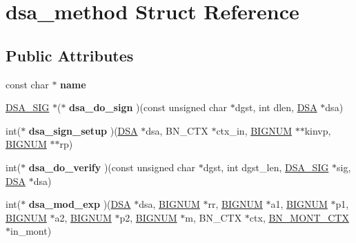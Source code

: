 \hypertarget{structdsa__method}{}\section{dsa\+\_\+method Struct Reference}
\label{structdsa__method}
\subsection*{Public Attributes}
\begin{DoxyCompactItemize}
\item 
\mbox{\label{structdsa__method_a83d504a9d8609d6172a7e4a824791933}} 
const char $\ast$ {\bfseries name}
\item 
\mbox{\label{structdsa__method_acac9dacfe7fd6637af11f0280ed087ad}} 
\hyperlink{struct_d_s_a___s_i_g__st}{D\+S\+A\+\_\+\+S\+IG} $\ast$($\ast$ {\bfseries dsa\+\_\+do\+\_\+sign} )(const unsigned char $\ast$dgst, int dlen, \hyperlink{structdsa__st}{D\+SA} $\ast$dsa)
\item 
\mbox{\label{structdsa__method_a6c731fb594e9d87b38351caf21b52f72}} 
int($\ast$ {\bfseries dsa\+\_\+sign\+\_\+setup} )(\hyperlink{structdsa__st}{D\+SA} $\ast$dsa, B\+N\+\_\+\+C\+TX $\ast$ctx\+\_\+in, \hyperlink{structbignum__st}{B\+I\+G\+N\+UM} $\ast$$\ast$kinvp, \hyperlink{structbignum__st}{B\+I\+G\+N\+UM} $\ast$$\ast$rp)
\item 
\mbox{\label{structdsa__method_a48d8dcf12cd14676633cde4b06dbe1c5}} 
int($\ast$ {\bfseries dsa\+\_\+do\+\_\+verify} )(const unsigned char $\ast$dgst, int dgst\+\_\+len, \hyperlink{struct_d_s_a___s_i_g__st}{D\+S\+A\+\_\+\+S\+IG} $\ast$sig, \hyperlink{structdsa__st}{D\+SA} $\ast$dsa)
\item 
\mbox{\label{structdsa__method_a6295bfda1f4be2fc9e04e69c6a104f4d}} 
int($\ast$ {\bfseries dsa\+\_\+mod\+\_\+exp} )(\hyperlink{structdsa__st}{D\+SA} $\ast$dsa, \hyperlink{structbignum__st}{B\+I\+G\+N\+UM} $\ast$rr, \hyperlink{structbignum__st}{B\+I\+G\+N\+UM} $\ast$a1, \hyperlink{structbignum__st}{B\+I\+G\+N\+UM} $\ast$p1, \hyperlink{structbignum__st}{B\+I\+G\+N\+UM} $\ast$a2, \hyperlink{structbignum__st}{B\+I\+G\+N\+UM} $\ast$p2, \hyperlink{structbignum__st}{B\+I\+G\+N\+UM} $\ast$m, B\+N\+\_\+\+C\+TX $\ast$ctx, \hyperlink{structbn__mont__ctx__st}{B\+N\+\_\+\+M\+O\+N\+T\+\_\+\+C\+TX} $\ast$in\+\_\+mont)

\end{DoxyCompactItemize}
